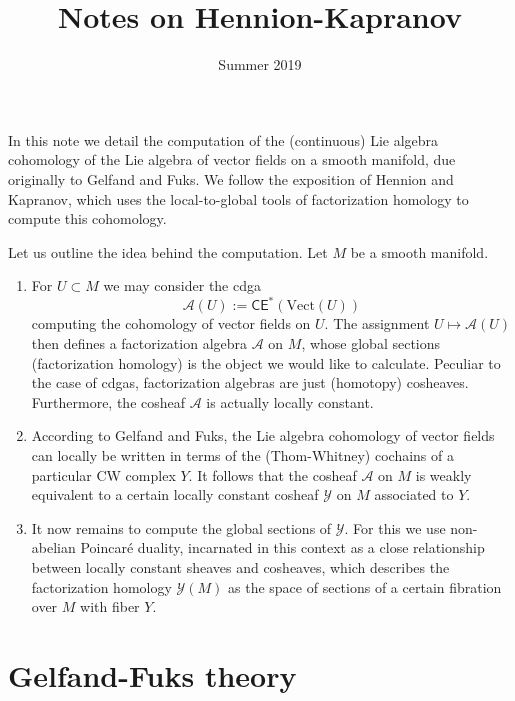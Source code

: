 \documentclass{amsart}
\theoremstyle{definition}
\newcommand{\Vect}{\text{Vect}}
\begin{document}
\title{Notes on Hennion-Kapranov}
\date{Summer 2019}

\maketitle

\vspace{.5cm}

In this note we detail the computation of the (continuous) Lie algebra 
cohomology of the Lie algebra of vector fields on a smooth manifold, due 
originally to Gelfand and Fuks. We follow the exposition of Hennion and 
Kapranov, which uses the local-to-global tools of factorization homology to 
compute this cohomology.

Let us outline the idea behind the computation. Let $M$ be a smooth manifold.
\begin{enumerate}[label=(\roman*)]
    \item For $U\subset M$ we may consider the cdga
        \begin{equation*}
            \mathcal{A}(U) := \mathsf{CE}^*(\Vect(U))
        \end{equation*}
        computing the cohomology of vector fields on $U$. The assignment 
        $U\mapsto \mathcal{A}(U)$ then defines a factorization algebra 
        $\mathcal{A}$ on $M$, whose global sections (factorization homology) is 
        the object we would like to calculate. Peculiar to the case of cdgas, 
        factorization algebras are just (homotopy) cosheaves. Furthermore, the 
        cosheaf $\mathcal{A}$ is actually locally constant.
    \item According to Gelfand and Fuks,
        the Lie algebra cohomology of vector fields can locally be written in 
        terms of the (Thom-Whitney) cochains of a particular CW complex $Y$. It 
        follows that the cosheaf $\mathcal{A}$ on $M$ is weakly equivalent to a 
        certain locally constant cosheaf $\mathcal{Y}$ on $M$ associated to $Y$.
    \item It now remains to compute the global sections of $\mathcal{Y}$. For 
        this we use non-abelian Poincar\'e duality, incarnated in this context 
        as a close relationship between locally constant sheaves and cosheaves,
        which describes the factorization homology $\mathcal{Y}(M)$ as the space 
        of sections of a certain fibration over $M$ with fiber $Y$.
\end{enumerate}

\section{Gelfand-Fuks theory}
\end{document}
